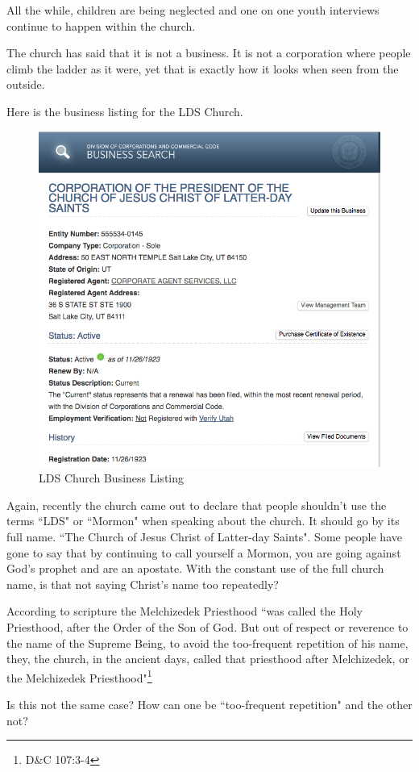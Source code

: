 All the while, children are being neglected and one on one youth interviews continue 
to happen within the church.

The church has said that it is not a business. It is not a corporation where people
climb the ladder as it were, yet that is exactly how it looks when seen from the
outside.

Here is the business listing for the LDS Church.

\begin{figure}[h!]
  \centering
  \includegraphics[width=1\linewidth]{articles/images/business.png}
  \caption{LDS Church Business Listing}
  \label{fig:tas1}
\end{figure}

Again, recently the church came out to declare that people shouldn't use the terms
``LDS" or ``Mormon" when speaking about the church. It should go by its full name.
``The Church of Jesus Christ of Latter-day Saints". Some people have gone to say that
by continuing to call yourself a Mormon, you are going against God's prophet and are
an apostate. With the constant use of the full church name, is that not saying
Christ's name too repeatedly?

According to scripture the Melchizedek Priesthood ``was called the Holy Priesthood, 
after the Order of the Son of God. But out of respect or reverence to the name of 
the Supreme Being, to avoid the too-frequent repetition of his name, 
they, the church, in the ancient days, called that priesthood after 
Melchizedek, or the Melchizedek Priesthood"\footnote{D\&C 107:3-4}

Is this not the same case? How can one be ``too-frequent repetition" and the other 
not?